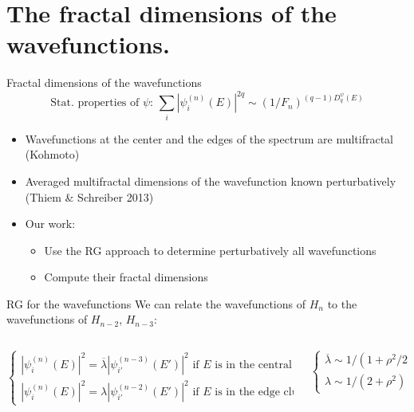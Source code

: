 \documentclass[xcolor=x11names,compress,professionalfonts]{beamer}
\renewcommand{\(}{\begin{columns}}
\renewcommand{\)}{\end{columns}}
\newcommand{\<}[1]{\begin{column}{#1}}
\renewcommand{\>}{\end{column}}
\newcommand{\lb}{\ensuremath{\overline{\lambda}}}
\begin{document}
\section{The fractal dimensions of the wavefunctions.}
\begin{frame}{Fractal dimensions of the wavefunctions}
	\[
	\text{Stat. properties of $\psi$:~} 
	\sum_i |\psi_i^{(n)}(E)|^{2q} \sim (1/F_n)^{(q-1)D_q^\psi(E)} 
	\]
\begin{itemize}
	\item Wavefunctions at the center and the edges of the spectrum are multifractal (Kohmoto)
	\item Averaged multifractal dimensions of the wavefunction known perturbatively (Thiem \& Schreiber 2013)
	\item Our work:
	\begin{itemize}
		\item Use the RG approach to determine perturbatively all wavefunctions
		\item Compute their fractal dimensions
	\end{itemize}
\end{itemize}
\end{frame}

\begin{frame}{RG for the wavefunctions}
We can relate the wavefunctions of $H_n$ to the wavefunctions of $H_{n-2}$, $H_{n-3}$:
	
	\centering
	
	
\begin{columns}
	\begin{column}{9cm}
	\[
	\begin{cases}
		|\psi_i^{(n)}(E)|^2 = \lb |\psi_{i'}^{(n-3)}(E')|^2 \text{~if $E$ is in the central cluster}\\
		|\psi_i^{(n)}(E)|^2 = \lambda |\psi_{i'}^{(n-2)}(E')|^2 \text{~if }E\text{~is in the edge clusters}
	\end{cases}
	\]
	\end{column}
	\begin{column}{3cm}
	\[
	\begin{cases}
		\lb \sim  1/(1+\rho^2/2) \\
		\lambda \sim 1/(2+\rho^2)
	\end{cases}
	\]
	\end{column}
\end{columns}
\end{frame}
\end{document}

